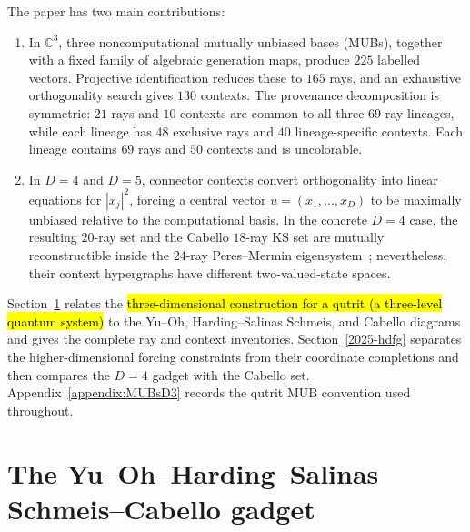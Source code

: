 \documentclass[%
  reprint,
  superscriptaddress,
  showpacs,
  showkeys,
  amsmath,amssymb,
  pra,
  longbibliography,
  floatfix,
  x11names
]{revtex4-2}
\newenvironment{revision}{\begingroup\color{revisionblue}}{\endgroup}
\newcommand{\corr}[1]{{\color{red}\hl{#1}}}
\begin{document}
\begin{revision}
The paper has two main contributions:
\begin{enumerate}
\item In $\mathbb{C}^3$, three noncomputational mutually unbiased bases (MUBs), together with a fixed family of algebraic generation maps, produce $225$ labelled vectors.  Projective identification reduces these to $165$ rays, and an exhaustive orthogonality search gives $130$ contexts.  The provenance decomposition is symmetric: $21$ rays and $10$ contexts are common to all three $69$-ray lineages, while each lineage has $48$ exclusive rays and $40$ lineage-specific contexts.  Each lineage contains $69$ rays and $50$ contexts and is uncolorable.
\item In $D=4$ and $D=5$, connector contexts convert orthogonality into linear equations for $|x_j|^2$, forcing a central vector $u=(x_1,\ldots,x_D)$ to be maximally unbiased relative to the computational basis.  In the concrete $D=4$ case, the resulting $20$-ray set and the Cabello $18$-ray KS set are mutually reconstructible inside the $24$-ray Peres--Mermin eigensystem~\cite{peres111,mermin90b,peres-91,pavicic-2004ksafq,cabello-96}; nevertheless, their context hypergraphs have different two-valued-state spaces.
\end{enumerate}

Section~\ref{2025-yohscg} relates the
\corr{three-dimensional construction for a qutrit (a three-level quantum system)}
to the Yu--Oh, Harding--Salinas Schmeis, and Cabello diagrams and gives the complete ray and context inventories.  Section~\ref{2025-hdfg} separates the higher-dimensional forcing constraints from their coordinate completions and then compares the $D=4$ gadget with the Cabello set.  Appendix~\ref{appendix:MUBsD3} records the qutrit MUB convention used throughout.
\end{revision}


\section{The Yu--Oh--Harding--Salinas Schmeis--Cabello gadget}
\label{2025-yohscg}
\end{document}
